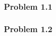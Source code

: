 \documentclass[12pt,letterpaper]{article}
\newcommand\chpnum{1}
\newenvironment{answer}[1]{
  \subsubsection*{Problem \chpnum.#1}
}{\newpage}
\begin{document}
\begin{answer}{1}

\end{answer}

\begin{answer}{2}

\end{answer}
\end{document}
